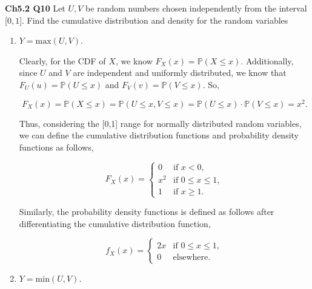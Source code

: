 \documentclass[12pt]{article}
\begin{document}

\noindent
\textbf{Ch5.2 Q10} Let $U, V$ be random numbers chosen independently from the interval [$0, 1$]. Find the cumulative distribution and density for the random variables

\begin{enumerate}[label=(\alph*)]
\item $Y = \text{max}(U, V)$.

\noindent
Clearly, for the CDF of $X$, we know $F_X(x) = \mathbb{P}(X \leq x)$. Additionally, since $U$ and $V$ are independent and uniformly distributed, we know that $F_U(u) = \mathbb{P}(U \leq x)$ and $F_V(v) = \mathbb{P}(V \leq x)$. So, 

\begin{equation*}
F_X(x) = \mathbb{P}(X \leq x) = \mathbb{P}(U \leq x, V \leq x) = \mathbb{P}(U \leq x) \cdot \mathbb{P}(V \leq x) = x^2.
\end{equation*}

\noindent
Thus, considering the [0,1] range for normally distributed random variables, we can define the cumulative distribution functions and probability density functions as follows,

\[ F_X(x) =  \begin{cases} 
	  0 & \text{if } x < 0, \\
      x^2  & \text{if } 0 \leq x \leq 1, \\
      1 & \text{if } x \geq 1.
      \end{cases} \]

\noindent
Similarly, the probability density functions is defined as follows after differentiating the cumulative distribution function,

\[ f_X(x) =  \begin{cases} 
      2x  & \text{if } 0 \leq x \leq 1, \\
      0 & \text{elsewhere}.
      \end{cases} \]

\item $Y = \text{min}(U, V)$.






























\end{enumerate}
\end{document}
